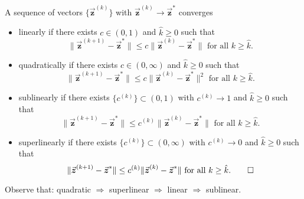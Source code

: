 \documentclass[9pt, headings=standardclasses, parskip=half]{scrartcl}
\renewcommand{\emph}[1]{\textcolor{mypurple}{#1}}
\newcommand{\vect}[1]{\vec{\boldsymbol{#1}}}
\begin{document}
\begin{definition}
\label{def:convergence_rates}
A sequence of vectors \(\{\vect{z}^{(k)}\}\) with \(\vect{z}^{(k)} \to \vect{z}^{*}\) converges
\begin{itemize}
  \item \emph{linearly} if there exists \(c \in (0,1)\) and \(\hat{k} \geq 0\) such that 
  \[
  \|\vect{z}^{(k+1)}-\vect{z}^{*}\| \leq c\|\vect{z}^{(k)}-\vect{z}^{*}\| \text{ for all } k \geq \hat{k} \text{.}
  \]
  \item \emph{quadratically} if there exists \(c \in (0,\infty)\) and \(\hat{k} \geq 0\) such that
  \[
  \|\vect{z}^{(k+1)}-\vect{z}^{*}\| \leq c\|\vect{z}^{(k)}-\vect{z}^{*}\|^{2} \text{ for all } k \geq \hat{k} \text{.}
  \]
  \item \emph{sublinearly} if there exists \(\{c^{(k)}\} \subset (0,1)\) with \(c^{(k)} \to 1\) and \(\hat{k} \geq 0\) such that
  \[
  \|\vect{z}^{(k+1)}-\vect{z}^{*}\| \leq c^{(k)}\|\vect{z}^{(k)}-\vect{z}^{*}\| \text{ for all } k \geq \hat{k} \text{.}
  \]
  \item \emph{superlinearly} if there exists \(\{c^{(k)}\} \subset (0,\infty)\) with \(c^{(k)} \to 0\) and \(\hat{k} \geq 0\) such that
  \[
  \|\vect{z}^{(k+1)}-\vect{z}^{*}\| \leq c^{(k)}\|\vect{z}^{(k)}-\vect{z}^{*}\| \text{ for all } k \geq \hat{k} \text{.}\qedhere
  \]
\end{itemize}
\end{definition}

\begin{remark}
Observe that: quadratic \(\Longrightarrow\) superlinear \(\Longrightarrow\) linear \(\Longrightarrow\) sublinear.
\end{remark}
\end{document}
